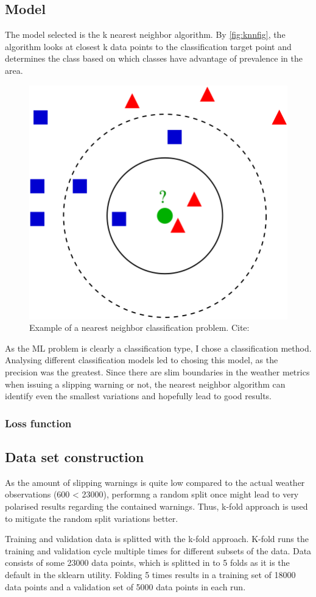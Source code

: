 \documentclass[12pt, a4paper]{report}
\begin{document}
    \subsection{Model}
    The model selected is the k nearest neighbor algorithm. By \autoref{fig:knnfig}, the algorithm looks at closest k data points
    to the classification target point and determines the class based on which classes have advantage of prevalence in the area.
    \begin{figure}
      \label{fig:knnfig}
      \caption{Example of a nearest neighbor classification problem. Cite: \cite{knnimage}}
      \centering
      \includegraphics[width=0.4\columnwidth]{KnnClassification.svg.png}
    \end{figure}

    As the ML problem is clearly a classification type, I chose a classification method.
    Analysing different classification models led to chosing this model, as the precision was the greatest. 
    Since there are slim boundaries in the weather metrics when issuing a slipping warning or not, the nearest neighbor
    algorithm can identify even the smallest variations and hopefully lead to good results.

    \subsubsection{Loss function}
    \subsection{Data set construction}
    As the amount of slipping warnings is quite low compared to the actual weather observations (600 < 23000), performng a random split once might lead to 
    very polarised results regarding the contained warnings. Thus, k-fold approach is used to mitigate the random split variations better.

    Training and validation data is splitted with the k-fold approach. K-fold runs the training and validation cycle multiple times for different
    subsets of the data. Data consists of some 23000 data points, which is splitted in to 5 folds as it is the default in the sklearn utility. 
    Folding 5 times results in a training set of 18000 data points and a validation set of 5000 data points in each run.
\end{document}
